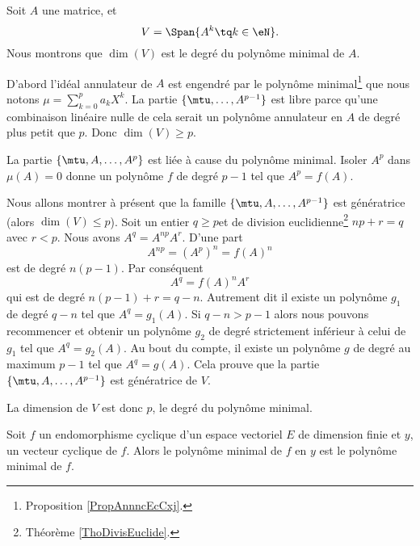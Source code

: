 \begin{example}
    Soit \( A\) une matrice, et 
    \begin{equation}
        V=\Span\{A^k\tq k\in \eN \}.
    \end{equation}
    Nous montrons que \( \dim(V)\) est le degré du polynôme minimal de \( A\).

    D'abord l'idéal annulateur de \( A\) est engendré par le polynôme minimal\footnote{Proposition \ref{PropAnnncEcCxj}.} que nous notons
        $\mu=\sum_{k=0}^pa_kX^k$.
    La partie \( \{ \mtu,\ldots, A^{p-1} \}\) est libre parce qu'une combinaison linéaire nulle de cela serait un polynôme annulateur en \( A\) de degré plus petit que \( p\). Donc \( \dim(V)\geq p\).

    La partie \( \{ \mtu,A,\ldots, A^p \}\) est liée à cause du polynôme minimal. Isoler \( A^p\) dans \( \mu(A)=0\) donne un polynôme \( f\) de degré \( p-1\) tel que \( A^p=f(A)\).

    Nous allons montrer à présent que la famille \( \{ \mtu,A,\ldots, A^{p-1} \}\) est génératrice (alors \( \dim(V)\leq p\)). Soit un entier \( q\geq p\)et de division euclidienne\footnote{Théorème \ref{ThoDivisEuclide}.} \( np+r=q\) avec \( r<p\). Nous avons \( A^q=A^{np}A^r\). D'une part
    \begin{equation}
        A^{np}=(A^p)^n=f(A)^n
    \end{equation}
    est de degré \( n(p-1)\). Par conséquent
    \begin{equation}
        A^q=f(A)^nA^r
    \end{equation}
    qui est de degré \( n(p-1)+r=q-n\). Autrement dit il existe un polynôme \( g_1\) de degré \( q-n\) tel que \( A^q=g_1(A)\). Si \( q-n>p-1\) alors nous pouvons recommencer et obtenir un polynôme \( g_2\) de degré strictement inférieur à celui de \( g_1\) tel que \( A^q=g_2(A)\). Au bout du compte, il existe un polynôme \( g\) de degré au maximum \( p-1\) tel que \( A^q=g(A)\). Cela prouve que la partie \( \{ \mtu,A,\ldots, A^{p-1} \}\) est génératrice de \( V\).

    La dimension de \( V\) est donc \( p\), le degré du polynôme minimal.
\end{example}

\begin{lemma}
    Soit \( f\) un endomorphisme cyclique d'un espace vectoriel \( E\) de dimension finie et \( y\), un vecteur cyclique de \( f\). Alors le polynôme minimal de \( f\) en \( y\) est le polynôme minimal de \( f\).
\end{lemma}

